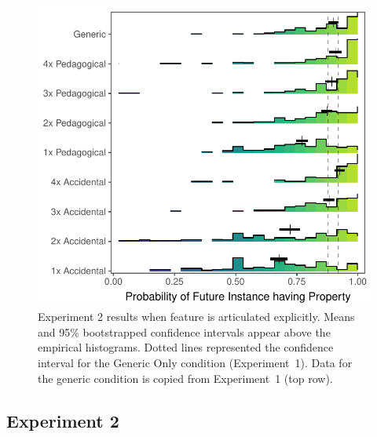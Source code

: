 \documentclass[10pt,letterpaper]{article}
\begin{document}
\begin{figure}[t]
\begin{center}
 \includegraphics[width=\linewidth]{figs/genex-expt2_9conditions_reordered.pdf}
\end{center}
\caption{Experiment 2 results when feature is articulated explicitly. Means and 95\% bootstrapped confidence intervals appear above the empirical histograms. Dotted lines represented the confidence interval for the Generic Only condition (Experiment~1). Data for the generic condition is copied from Experiment~1 (top row).}
\label{fig:results2}
\end{figure}
\subsection{Experiment 2}
\end{document}
